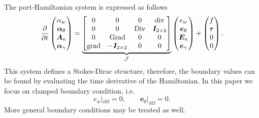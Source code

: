 \documentclass{ifacconf}
\begin{document}
The port-Hamiltonian system is expressed as follows 
\begin{equation}
\label{eq:PH_sys_Min_Ten}
\diffp{}{t}
\begin{pmatrix}
\alpha_w \\
\bm\alpha_\theta \\
\bm{A}_\kappa \\
\bm\alpha_{\gamma} \\
\end{pmatrix} = 
\underbrace{\begin{bmatrix}
	0  & 0  & 0  & \mathrm{div} \\
	0 & 0 &  \mathrm{Div} & \bm{I}_{2 \times 2}\\
	0  & \mathrm{Grad}  & 0  & 0\\
	\mathrm{grad} & -\bm{I}_{2 \times 2} &  0 & 0  \\
	\end{bmatrix}}_{\mathcal{J}}
\begin{pmatrix}
e_w \\
\bm{e}_{\theta} \\
\bm{E}_{\kappa} \\
\bm{e}_{\gamma} \\
\end{pmatrix} + 
\begin{pmatrix}
f \\
\bm{\tau} \\
0 \\
0 \\
\end{pmatrix}.
\end{equation}
This system defines a Stokes-Dirac structure, therefore, the boundary values can be found by evaluating the time derivative of the Hamiltonian. In this paper we focus on clamped boundary condition, i.e.
\[
e_w|_{\partial \Omega} = 0, \qquad \bm{e}_{\theta}|_{\partial \Omega} = 0.
\]
More general boundary conditions may be treated as well.
\end{document}
